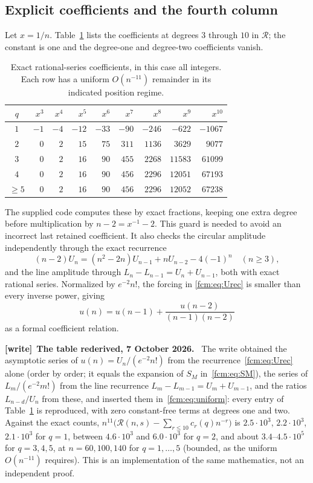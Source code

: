 \documentclass[11pt,letterpaper]{article}
\theoremstyle{remark}\newtheorem{remark}[theorem]{Remark}
\newcommand{\RR}{\mathcal R}
\newenvironment{writenote}[1][]{\par\smallskip\begingroup\small
 \noindent\textbf{[write]}\if\relax\detokenize{#1}\relax\else~\textbf{#1.}\fi\ }%
 {\par\endgroup\smallskip}
\begin{document}
\subsection{Explicit coefficients and the fourth column}
Let $x=1/n$. Table~\ref{fcm:tab:coeffs} lists the coefficients at degrees $3$ through $10$ in $\RR$; the constant is one and the degree-one and degree-two coefficients vanish.
\begin{table}[ht]
\centering\small
\begin{tabular}{c|rrrrrrrr}
\toprule
$q$ & $x^3$ & $x^4$ & $x^5$ & $x^6$ & $x^7$ & $x^8$ & $x^9$ & $x^{10}$\\
\midrule
$1$ & $-1$ & $-4$ & $-12$ & $-33$ & $-90$ & $-246$ & $-622$ & $-1067$\\
$2$ & $0$ & $2$ & $15$ & $75$ & $311$ & $1136$ & $3629$ & $9077$\\
$3$ & $0$ & $2$ & $16$ & $90$ & $455$ & $2268$ & $11583$ & $61099$\\
$4$ & $0$ & $2$ & $16$ & $90$ & $456$ & $2296$ & $12051$ & $67193$\\
$\ge5$ & $0$ & $2$ & $16$ & $90$ & $456$ & $2296$ & $12052$ & $67238$\\
\bottomrule
\end{tabular}
\caption{Exact rational-series coefficients, in this case all integers. Each row has a uniform $O(n^{-11})$ remainder in its indicated position regime.}\label{fcm:tab:coeffs}
\end{table}
The supplied code computes these by exact fractions, keeping one extra degree before multiplication by $n-2=x^{-1}-2$. This guard is needed to avoid an incorrect last retained coefficient. It also checks the circular amplitude independently through the exact recurrence
\begin{equation}\label{fcm:eq:Urec}
 (n-2)U_n=(n^2-2n)U_{n-1}+nU_{n-2}-4(-1)^n\quad(n\ge3),
\end{equation}
and the line amplitude through $L_n-L_{n-1}=U_n+U_{n-1}$, both with exact rational series. Normalized by $e^{-2}n!$, the forcing in \eqref{fcm:eq:Urec} is smaller than every inverse power, giving
\[
 u(n)=u(n-1)+\frac{u(n-2)}{(n-1)(n-2)}
\]
as a formal coefficient relation.
\begin{writenote}[The table rederived, 7 October 2026]
The write obtained the asymptotic series of $u(n)=U_n/(e^{-2}n!)$ from the
recurrence~\eqref{fcm:eq:Urec} alone (order by order; it equals the expansion
of $S_M$ in~\eqref{fcm:eq:SM}), the series of $L_m/(e^{-2}m!)$ from the line
recurrence $L_m-L_{m-1}=U_m+U_{m-1}$, and the ratios $L_{n-d}/U_n$ from these,
and inserted them in~\eqref{fcm:eq:uniform}: every entry of
Table~\ref{fcm:tab:coeffs} is reproduced, with zero constant-free terms at
degrees one and two. Against the exact counts,
$n^{11}\bigl(\RR(n,s)-\sum_{r\le10}c_r(q)n^{-r}\bigr)$ is $2.5\cdot10^3$, $2.2\cdot10^3$, $2.1\cdot10^3$ for $q=1$, between $4.6\cdot10^3$ and $6.0\cdot10^3$ for $q=2$, and about $3.4$--$4.5\cdot10^5$ for $q=3,4,5$, at
$n=60,100,140$ for $q=1,\ldots,5$ (bounded, as the uniform $O(n^{-11})$
requires). This is an implementation of the same mathematics, not an
independent proof.
\end{writenote}
\end{document}
